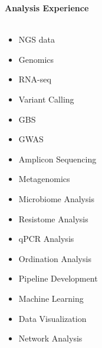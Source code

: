 \vspace{0.5cm}
{\Large \textbf{Analysis Experience} }\\[-0.4cm]
\makebox[\linewidth]{\rule{1.0\textwidth}{0.4pt}}\\
\vspace{-0.7cm}
\begin{multicols}{3}
\begin{itemize}\setlength\itemsep{-.1cm}
    \item[] NGS data \\[-0.1cm]
    \item[] Genomics \\[-0.1cm]
    \item[] RNA-seq \\[-0.1cm]
    \item[] Variant Calling \\[-0.1cm]
    \item[] GBS \\[-0.1cm]
    \item[] GWAS \\[-0.1cm]
    \item[] Amplicon Sequencing \\[-0.1cm]
    \item[] Metagenomics \\[-0.1cm]
    \item[] Microbiome Analysis \\[-0.1cm]
    \item[] Resistome Analysis \\[-0.1cm]
    \item[] qPCR Analysis \\[-0.1cm]
    \item[] Ordination Analysis \\[-0.1cm]
    \item[] Pipeline Development \\[-0.1cm]
    \item[] Machine Learning \\[-0.1cm]
    \item[] Data Visualization \\[-0.1cm]
    \item[] Network Analysis \\[-0.1cm]
\end{itemize}
\end{multicols}
\vspace{-0.5cm}